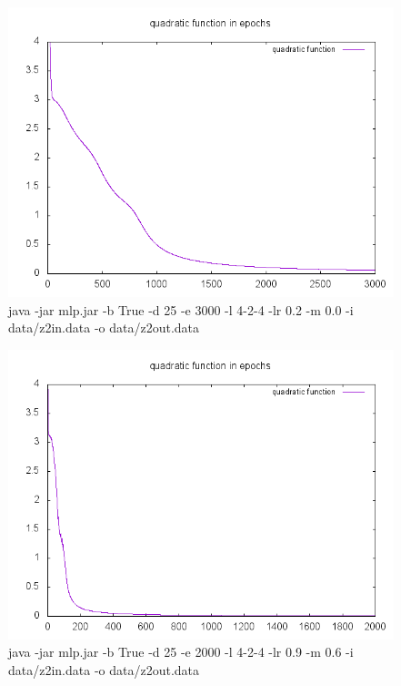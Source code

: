 \documentclass{classrep}
\begin{document}
{\begin{figure}[h!]
 \centering
 \includegraphics[width=12cm]{img/424lr02.png}
 \vspace{-0.3cm}
 \caption{java -jar mlp.jar -b True -d 25 -e 3000 -l 4-2-4 -lr 0.2 -m 0.0 -i data/z2in.data -o data/z2out.data}
\end{figure}

\newpage

\begin{figure}[h!]
 \centering
 \includegraphics[width=12cm]{img/424lr09m06.png}
 \vspace{-0.3cm}
 \caption{java -jar mlp.jar -b True -d 25 -e 2000 -l 4-2-4 -lr 0.9 -m 0.6 -i data/z2in.data -o data/z2out.data}
\end{figure}

}
\end{document}

